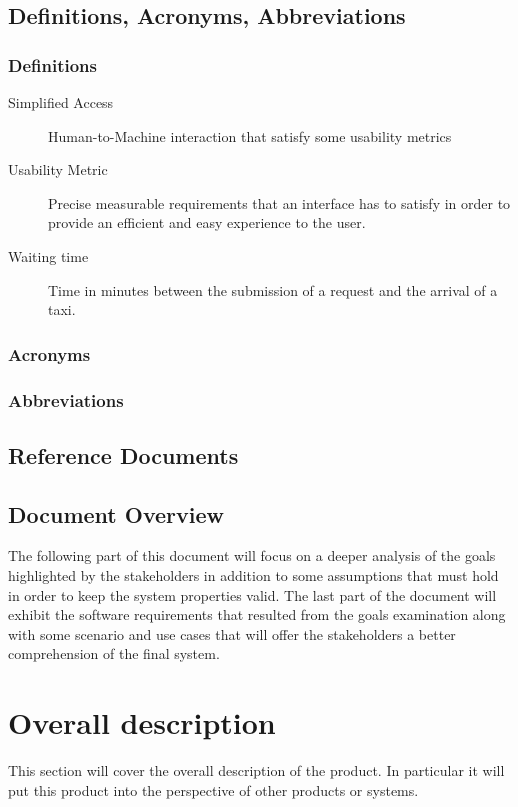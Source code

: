 \documentclass[11pt, a4paper,titlepage]{article}
\begin{document}
\subsection{Definitions, Acronyms, Abbreviations}
\subsubsection{Definitions}
	\begin{description}
		\item[Simplified Access] \label{itm:Desc_SimplifiedAccess} Human-to-Machine interaction that satisfy some usability metrics
		\item[Usability Metric] \label{itm:Desc_UsabilityMetric} Precise measurable requirements that an interface has to satisfy in order to provide an efficient and easy experience to the user.
		\item[Waiting time] \label{itm:Desc_WaitingTime} Time in minutes between the submission of a request and the arrival of a taxi.
	\end{description}
\subsubsection{Acronyms}
\subsubsection{Abbreviations}
\subsection{Reference Documents}
\subsection{Document Overview}
The following part of this document will focus on a deeper analysis of the goals highlighted by the stakeholders in addition to some assumptions that must hold in order to keep the system properties valid. The last part of the document will exhibit the software requirements that resulted from the goals examination along with some scenario and use cases that will offer the stakeholders a better comprehension of the final system.   
\section{Overall description}
This section will cover the overall description of the product. In particular it will put this product into the perspective of other products or systems. 
\end{document}
